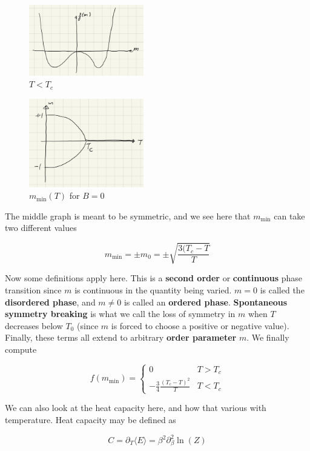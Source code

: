 \documentclass{article}
\theoremstyle{definition}
\begin{document}
\begin{figure}[H]
  \centering
  \includegraphics[width=5cm]{res/SFT/f_vs_m_low_T_B0}
  \caption{$T < T_c$}
  \label{figure: f_vs_m_low_T_B0}
\end{figure}

\begin{figure}[H]
  \centering
  \includegraphics[width=5cm]{res/SFT/m_vs_T_B0}
  \caption{$m_{\text{min}}(T)$ for $B = 0$}
  \label{figure: m_vs_T_B0}
\end{figure}

The middle graph is meant to be symmetric, and we see here that $m_{\text{min}}$
can take two different values

$$ m_{\text{min}} = \pm m_0 = \pm \sqrt{\frac{3(T_c - T}{T}} $$

Now some definitions apply here. This is a \textbf{second order} or
\textbf{continuous} phase transition since $m$ is continuous in the quantity
being varied. $m = 0$ is called the \textbf{disordered phase}, and $m \neq 0$ is
called an \textbf{ordered phase}. \textbf{Spontaneous symmetry breaking} is what
we call the loss of symmetry in $m$ when $T$ decreases below $T_0$ (since $m$ is
forced to choose a positive or negative value). Finally, these terms all extend
to arbitrary \textbf{order parameter} $m$. We finally compute

$$ f(m_{\text{min}}) =
\begin{cases}
  0 & T > T_c \\
  -\frac{3}{4} \frac{(T_c - T)^2}{T} & T < T_c
\end{cases} $$

We can also look at the heat capacity here, and how that various with
temperature. Heat capacity may be defined as

$$ C = \partial_T \langle E \rangle = \beta^2 \partial_\beta^2 \ln(Z) $$
\end{document}
